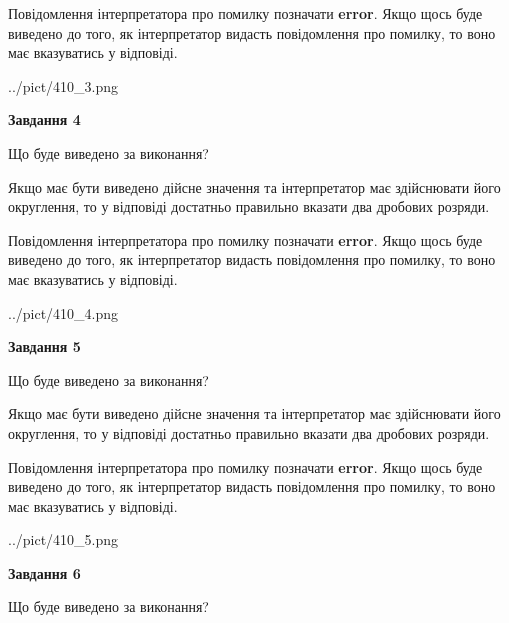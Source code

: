 \documentclass[12pt, ukrainian]{article}
\begin{document}
{\begin {Large}
Повідомлення інтерпретатора про помилку позначати \textbf{error}.
Якщо щось буде виведено до того, як інтерпретатор видасть повідомлення про помилку, 
то воно має вказуватись у відповіді. \par

\begin{center}
	{../pict/410_3.png}
\end{center}
\newpage

{\begin {center}\textbf{Завдання 4}\end {center}}\par
Що буде виведено за виконання? \par

Якщо має бути виведено дійсне значення та інтерпретатор має здійснювати його округлення, 
то у відповіді достатньо правильно вказати два дробових розряди.

Повідомлення інтерпретатора про помилку позначати \textbf{error}.
Якщо щось буде виведено до того, як інтерпретатор видасть повідомлення про помилку, 
то воно має вказуватись у відповіді. \par

\begin{center}
	{../pict/410_4.png}
\end{center}
\newpage

{\begin {center}\textbf{Завдання 5}\end {center}}\par
Що буде виведено за виконання? \par

Якщо має бути виведено дійсне значення та інтерпретатор має здійснювати його округлення, 
то у відповіді достатньо правильно вказати два дробових розряди.

Повідомлення інтерпретатора про помилку позначати \textbf{error}.
Якщо щось буде виведено до того, як інтерпретатор видасть повідомлення про помилку, 
то воно має вказуватись у відповіді. \par

\begin{center}
	{../pict/410_5.png}
\end{center}
\newpage

{\begin {center}\textbf{Завдання 6}\end {center}}\par
Що буде виведено за виконання? \par


\end{Large}}
\end{document}
